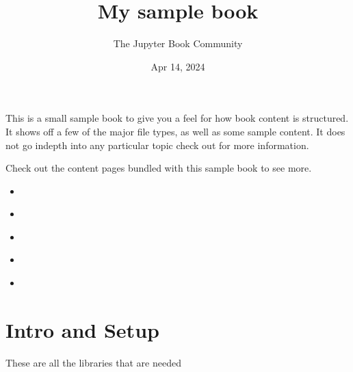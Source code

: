 \documentclass[letterpaper,10pt,english]{jupyterBook}
\title{My sample book}
\date{Apr 14, 2024}
\author{The Jupyter Book Community}
\begin{document}
\pagestyle{empty}
\sphinxmaketitle
\pagestyle{plain}
\sphinxtableofcontents
\pagestyle{normal}
\label{\detokenize{intro::doc}}


\sphinxAtStartPar
This is a small sample book to give you a feel for how book content is
structured.
It shows off a few of the major file types, as well as some sample content.
It does not go in\sphinxhyphen{}depth into any particular topic \sphinxhyphen{} check out  for more information.

\sphinxAtStartPar
Check out the content pages bundled with this sample book to see more.
\begin{itemize}
\item {} 
\sphinxAtStartPar
{\hyperref[\detokenize{data::doc}]{}}

\item {} 
\sphinxAtStartPar
{\hyperref[\detokenize{interpolation::doc}]{}}

\item {} 
\sphinxAtStartPar
{\hyperref[\detokenize{loss::doc}]{}}

\item {} 
\sphinxAtStartPar
{\hyperref[\detokenize{finite_gradient::doc}]{}}

\item {} 
\sphinxAtStartPar
{\hyperref[\detokenize{dirty_gradient::doc}]{}}

\end{itemize}

\sphinxstepscope


\chapter{Intro and Setup}
\label{\detokenize{data:intro-and-setup}}\label{\detokenize{data::doc}}
\sphinxAtStartPar
These are all the libraries that are needed
\end{document}
